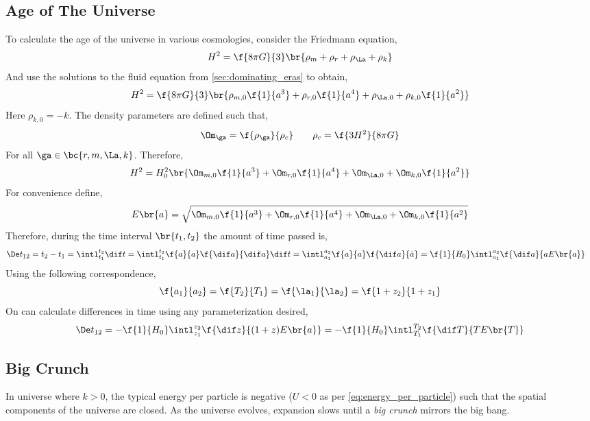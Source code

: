 \documentclass{article}
\begin{document}
\subsection{Age of The Universe}

To calculate the age of the universe in various cosmologies, consider the Friedmann equation,
\[ H^2 = \f{8 \pi G}{3} \br{\rho_m + \rho_r + \rho_\La + \rho_k} \]
And use the solutions to the fluid equation from \cref{sec:dominating_eras} to obtain,
\[ H^2 = \f{8 \pi G}{3} \br{\rho_{m,0}\f{1}{a^3} + \rho_{r,0}\f{1}{a^4} + \rho_{\La,0} + \rho_{k,0}\f{1}{a^2} } \]
Here $\rho_{k,0} = -k$. The density parameters are defined such that,
\[ \Om_{\ga} = \f{\rho_{\ga}}{\rho_{c}} \qquad \rho_{c} = \f{3 H^2}{8 \pi G} \]
For all $\ga \in \bc{r, m , \La, k}$. Therefore,
\[ H^2 = H_0^2\br{\Om_{m,0}\f{1}{a^3} + \Om_{r,0}\f{1}{a^4} + \Om_{\La,0} + \Om_{k,0}\f{1}{a^2} } \]
For convenience define,
\[ E\br{a} = \sqrt{\Om_{m,0}\f{1}{a^3} + \Om_{r,0}\f{1}{a^4} + \Om_{\La,0} + \Om_{k,0}\f{1}{a^2} } \]
Therefore, during the time interval $\br{t_1, t_2}$ the amount of time passed is,
\begin{align*}
    \De t_{12}
    &= t_2 - t_1 = \intl_{t_1}^{t_2} \dif t = \intl_{t_1}^{t_2} \f{a}{a} \f{\dif a}{\dif a} \dif t = \intl_{a_1}^{a_2} \f{a}{a} \f{\dif a}{\dot a} = \f{1}{H_0}\intl_{a_1}^{a_2} \f{\dif a}{a E\br{a}}
\end{align*}
Using the following correspondence,
\[ \f{a_1}{a_2} = \f{T_2}{T_1} = \f{\la_1}{\la_2} = \f{1 + z_2}{1 + z_1} \]
On can calculate differences in time using any parameterization desired,
\[ \De t_{12} = -\f{1}{H_0} \intl_{z_1}^{z_2} \f{\dif z}{(1+z) E\br{a}} = -\f{1}{H_0}\intl_{T_1}^{T_2} \f{\dif T}{T E\br{T}} \]
\subsection{Big Crunch}
In universe where $k > 0$, the typical energy per particle is negative ($U < 0$ as per \cref{eq:energy_per_particle}) such that the spatial components of the universe are closed. As the universe evolves, expansion slows until a \textit{big crunch} mirrors the big bang. \\
\end{document}
